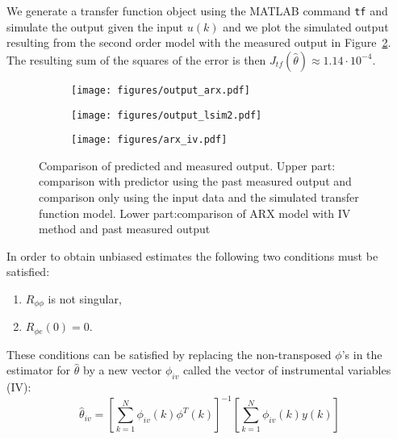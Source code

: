 We generate a transfer function object using the MATLAB command \texttt{tf} and simulate the output given the input $u(k)$ and we plot the simulated output resulting from the second order model with the measured output in Figure~\ref{fig:output_lsim2}.
The resulting sum of the squares of the error is then $ J_{tf}(\hat{\theta}) \approx 1.14 \cdot 10^{-4}$. 
\begin{figure}[h!]
	\centering
	\begin{subfigure}{.49\textwidth}
		\texttt{[image: figures/output\_arx.pdf]}
		\label{fig:output_arx}
	\end{subfigure}\hfill
	\begin{subfigure}{.49\textwidth}
		\texttt{[image: figures/output\_lsim2.pdf]}
		\label{fig:output_lsim2}
	\end{subfigure}
	\begin{subfigure}{\textwidth}
		\vspace*{1cm}
		\texttt{[image: figures/arx\_iv.pdf]}
		 \label{fig:output_arx_iv}
	\end{subfigure}
	\caption{Comparison of predicted and measured output. Upper part: comparison with predictor using the past measured output and comparison only using the input data and the simulated transfer function model. Lower part:comparison of ARX model with IV method and past measured output}
\end{figure}
In order to obtain unbiased estimates the following two conditions must be satisfied: 
\begin{enumerate}
\item $R_{\phi \phi}$ is not singular,
\item $R_{\phi e }(0) = 0$.
\end{enumerate}
These conditions can be satisfied by replacing the non-transposed $\phi$'s in the estimator for $\hat{\theta}$ by a new vector $\phi_{iv}$ called the vector of  instrumental variables (IV):
\begin{equation}
	\hat{\theta}_{iv} = \left[ \sum\limits_{k=1}^N \phi_{iv}(k)\phi^T(k) \right]^{-1} \left[\sum\limits_{k=1}^N \phi_{iv}(k) y(k) \right]
\end{equation}
